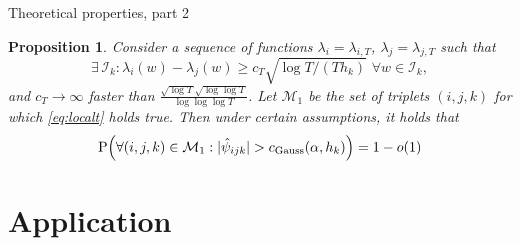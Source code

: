 \documentclass[10pt]{beamer}
\newcommand{\Prob}{\mathrm{P}}
\newtheorem{prop}{Proposition}
\begin{document}
\begin{frame}{Theoretical properties, part 2}
\begin{prop}\label{prop2}
Consider a sequence of functions $\lambda_{i} = \lambda_{i,T}$, $\lambda_{j} = \lambda_{j, T}$ such that 
\begin{equation}\label{eq:localt}
\exists \, \mathcal{I}_{k}:  \lambda_{i}(w) - \lambda_{j}(w) \ge c_T \sqrt{\log T / (T h_{k})} \,\, \forall w \in \mathcal{I}_{k},
\end{equation} and $c_T \rightarrow \infty$ faster than $\frac{\sqrt{\log T}\sqrt{\log \log T}}{\log \log \log T}$.  Let $\mathcal{M}_1$ be the set of triplets $(i, j, k)$ for which \eqref{eq:localt} holds true. Then under certain assumptions, it holds that
\begin{equation*}
\Prob\Big( \forall (i,j,k) \in \mathcal{M}_1: |\hat{\psi}_{ijk}| > c_{\textnormal{Gauss}}(\alpha,h_k) \Big) = 1 - o(1)
\end{equation*}
\end{prop}
\end{frame}



\section{Application}

%
%
%
\end{document}
